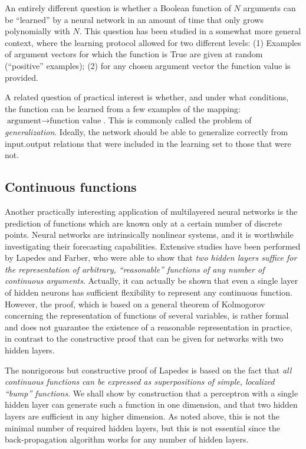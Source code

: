 An entirely different question is whether a Boolean function of $N$ arguments can be ``learned'' by a neural network in an amount of time that only grows polynomially with $N$. This question has been studied in a somewhat more general context, where the learning protocol allowed for two different levels: (1) Examples of argument vectors for which the function is True are given at random (``positive'' examples); (2) for any chosen argument vector the function value is provided.

A related question of practical interest is whether, and under what conditions, the function can be learned from a few examples of the mapping: $\text{argument}\rightarrow\text{function value}$. This is commonly called the problem of \emph{generalization}. Ideally, the network should be able to generalize correctly from input.output relations that were included in the learning set to those that were not.
\subsection{Continuous functions}\label{sec:Continuousfunctions}
Another practically interesting application of multilayered neural networks is the prediction of functions which are known only at a certain number of discrete points. Neural networks are intrinsically nonlinear systems, and it is worthwhile investigating their forecasting capabilities. Extensive studies have been performed by Lapedes and Farber, who were able to show that \emph{two hidden layers suffice for the representation of arbitrary, ``reasonable'' functions of any number of continuous arguments}. Actually, it can actually be shown that even a single layer of hidden neurons has sufficient flexibility to represent any continuous function. However, the proof, which is based on a general theorem of Kolmogorov concerning the representation of functions of several variables, is rather formal and does not guarantee the existence of a reasonable representation in practice, in contrast to the constructive proof that can be given for networks with two hidden layers.

The nonrigorous but constructive proof of Lapedes is based on the fact that \emph{all continuous functions can be expressed as superpositions of simple, localized ``bump'' functions}. We shall show by construction that a perceptron with a single hidden layer can generate such a function in one dimension, and that two hidden layers are sufficient in any higher dimension. As noted above, this is not the minimal number of required hidden layers, but this is not essential since the back-propagation algorithm works for any number of hidden layers.


